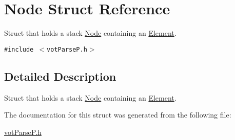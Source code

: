 \hypertarget{structNode}{
\section{Node Struct Reference}
\label{structNode}
}
Struct that holds a stack \hyperlink{structNode}{Node} containing an \hyperlink{structElement}{Element}.  


{\tt \#include $<$votParseP.h$>$}



\subsection{Detailed Description}
Struct that holds a stack \hyperlink{structNode}{Node} containing an \hyperlink{structElement}{Element}. 

The documentation for this struct was generated from the following file:\begin{CompactItemize}
\item 
\hyperlink{votParseP_8h}{votParseP.h}\end{CompactItemize}
